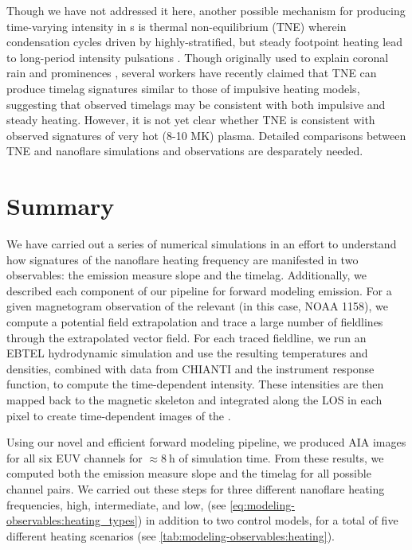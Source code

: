 Though we have not addressed it here, another possible mechanism for producing time-varying intensity in \AR s is thermal non-equilibrium (TNE) wherein condensation cycles driven by highly-stratified, but steady footpoint heating lead to long-period intensity pulsations \citep{kuin_thermal_1982}. Though originally used to explain coronal rain \citep{antolin_coronal_2010,antolin_multithermal_2015,auchere_coronal_2018} and prominences \citep{antiochos_model_1991}, several workers \citep{mok_three-dimensional_2016,winebarger_investigation_2016,froment_long-period_2017,winebarger_identifying_2018,froment_occurrence_2018} have recently claimed that TNE can produce timelag signatures similar to those of impulsive heating models, suggesting that observed timelags may be consistent with both impulsive and steady heating. However, it is not yet clear whether TNE is consistent with observed signatures of very hot (8-10 MK) plasma. Detailed comparisons between TNE and nanoflare simulations and observations are desparately needed.

\section{Summary}\label{sec:modeling-observables:conclusions}

We have carried out a series of numerical simulations in an effort to understand how signatures of the nanoflare heating frequency are manifested in two observables: the emission measure slope and the timelag. Additionally, we described each component of our pipeline for forward modeling \AR{} emission. For a given magnetogram observation of the relevant \AR{} (in this case, NOAA 1158), we compute a potential field extrapolation and trace a large number of fieldlines through the extrapolated vector field. For each traced fieldline, we run an EBTEL hydrodynamic simulation and use the resulting temperatures and densities, combined with data from CHIANTI and the instrument response function, to compute the time-dependent intensity. These intensities are then mapped back to the magnetic skeleton and integrated along the LOS in each pixel to create time-dependent images of the \AR{}.

Using our novel and efficient forward modeling pipeline, we produced AIA images for all six EUV channels for $\approx\SI{8}{\hour}$ of simulation time. From these results, we computed both the emission measure slope and the timelag for all possible channel pairs. We carried out these steps for three different nanoflare heating frequencies, high, intermediate, and low, (see \autoref{eq:modeling-observables:heating_types}) in addition to two control models, for a total of five different heating scenarios (see \autoref{tab:modeling-observables:heating}).

